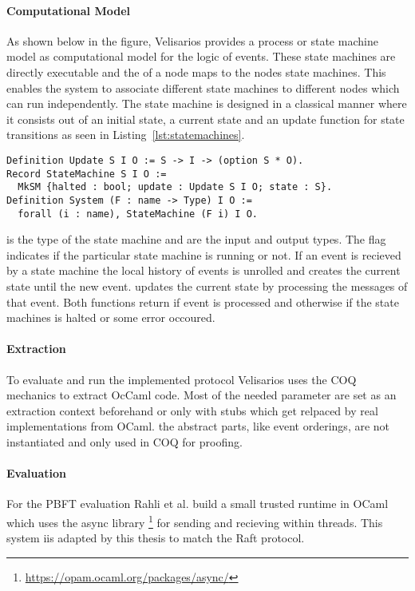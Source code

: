 \paragraph{Computational Model}
As shown below in the figure, Velisarios provides a process or state machine
model as computational model for the logic of events. These state machines
are directly executable and the  of a node maps to the nodes
state machines. This enables the system to associate different state machines
to different nodes which can run independently.
The state machine is designed in a classical manner where
it consists out of an initial state, a current state and an update function
for state transitions as seen in Listing~\ref{lst:statemachines}.

\begin{lstlisting}[style=coq,float,label=lst:statemachines,caption=State
machine definition and update function.]
Definition Update S I O := S -> I -> (option S * O).
Record StateMachine S I O := 
  MkSM {halted : bool; update : Update S I O; state : S}.
Definition System (F : name -> Type) I O :=
  forall (i : name), StateMachine (F i) I O.
\end{lstlisting}

 is the type of the state machine and  are the input
and output types. The  flag indicates if the particular
state machine is running or not. If an event  is recieved by
a state machine the local history of events is unrolled and
 creates the current state until
the new event.  updates the current
state by processing the messages of that event. Both functions
return  if event is processed and otherwise
 if the state machines is halted or some error occoured.~\cite{rahli2018velisarios}

\paragraph{Extraction}
To evaluate and run the implemented protocol Velisarios
uses the COQ mechanics to extract OcCaml code. Most of
the needed parameter are set as an extraction context beforehand
or only with stubs which get relpaced by real implementations from
OCaml. the abstract parts, like event orderings, are not
instantiated and only used in COQ for proofing.~\cite{rahli2018velisarios}

\paragraph{Evaluation}
For the PBFT evaluation Rahli et al. build a small
trusted runtime in OCaml which uses the async library
\footnote{\url{https://opam.ocaml.org/packages/async/}}
for sending and recieving within threads. This system
iis adapted by this thesis to match the Raft protocol.



